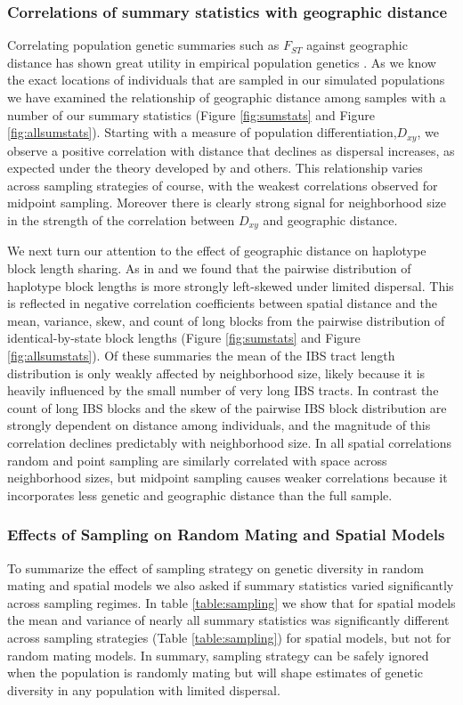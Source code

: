 \documentclass[11pt,twoside,lineno]{preprint}
\begin{document}
\subsubsection{Correlations of summary statistics with geographic distance}
Correlating population genetic summaries such as $F_{ST}$ against geographic distance has shown great utility in empirical population genetics \citep{Rousset1997}. As we know the exact locations of individuals that are sampled in our simulated populations we have examined the relationship of geographic distance among samples with a number of our summary statistics (Figure \ref{fig:sumstats} and Figure \ref{fig:allsumstats}). Starting with a measure of population differentiation,$D_{xy}$, we observe a positive correlation with distance that declines as dispersal increases, as expected under the theory developed by \citep{Rousset1997} and others. This relationship varies across sampling strategies of course, with the weakest correlations observed for midpoint sampling. Moreover there is clearly strong signal for  neighborhood size in the strength of the correlation between $D_{xy}$ and geographic distance.

We next turn our attention to the effect of geographic distance on haplotype block length sharing. As in \citep{Ringbauer2017} and \citep{Baharian2016} we found that the pairwise distribution of haplotype block lengths is more strongly left-skewed under limited dispersal. This is reflected in negative correlation coefficients between spatial distance and the mean, variance, skew, and count of long blocks from the pairwise distribution of identical-by-state block lengths (Figure \ref{fig:sumstats} and Figure \ref{fig:allsumstats}). Of these summaries the mean of the IBS tract length distribution is only weakly affected by neighborhood size, likely because it is heavily influenced by the small number of very long IBS tracts. In contrast the count of long IBS blocks and the skew of the pairwise IBS block distribution are strongly dependent on distance among individuals, and the magnitude of this correlation declines predictably with neighborhood size. In all spatial correlations random and point sampling are similarly correlated with space across neighborhood sizes, but midpoint sampling causes weaker correlations because it incorporates less genetic and geographic distance than the full sample. 

\subsubsection{Effects of Sampling on Random Mating and Spatial Models}
To summarize the effect of sampling strategy on genetic diversity in random mating and spatial models we also asked if summary statistics varied significantly across sampling regimes. In table \ref{table:sampling} we show that for spatial models the mean and variance of nearly all summary statistics was significantly different across sampling strategies (Table \ref{table:sampling}) for spatial models, but not for random mating models. In summary, sampling strategy can be safely ignored when the population is randomly mating but will shape estimates of genetic diversity in any population with limited dispersal. 
\end{document}
